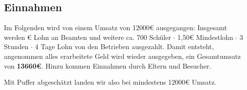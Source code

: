 \documentclass{sasbase}
\begin{document}
\newpage

\subsection{Einnahmen}

\noindent Im Folgenden wird von einem Umsatz von 12000€ ausgegangen: Insgesamt werden \thebeamten € Lohn
an Beamten und weitere ca. 700 Schüler $\cdot$ 1,50€ Mindestlohn $\cdot$ 3 Stunden
$\cdot$ 4 Tage Lohn von den Betrieben ausgezahlt.
Damit entsteht, angenommen alles erarbeitete Geld wird wieder ausgegeben, ein Gesamtumsatz von
\textbf{13660€}. Hinzu kommen Einnahmen durch Eltern und Besucher.

\noindent Mit Puffer abgeschätzt landen wir also bei mindestens 12000€ Umsatz.

\vspace{5mm}
\begin{kostenrechnung}
\end{kostenrechnung}
\end{document}
